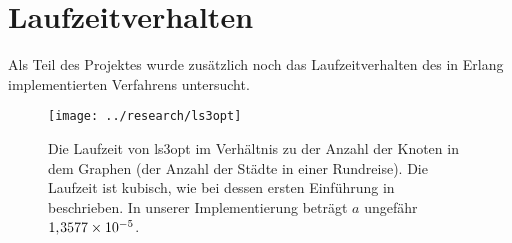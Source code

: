 \section{Laufzeitverhalten}
Als Teil des Projektes wurde zusätzlich noch das Laufzeitverhalten des
in Erlang implementierten Verfahrens untersucht. 
\begin{figure}[H]
  \centering
  \texttt{[image: ../research/ls3opt]}
  \caption[Laufzeit von ls3opt im Verhältnis zu der Anzahl der
  Knoten]{\label{fig:ls3optcomplxty} Die Laufzeit von ls3opt im
    Verhältnis zu der Anzahl der Knoten in dem Graphen (der Anzahl der
    Städte in einer Rundreise).  Die Laufzeit ist kubisch, wie bei
    dessen ersten Einführung in \cite{lin1965computer} beschrieben.
    In unserer Implementierung beträgt $a$ ungefähr
    $1,\kern-1pt 3577 \times 10^{-5}$.} %
\end{figure}


